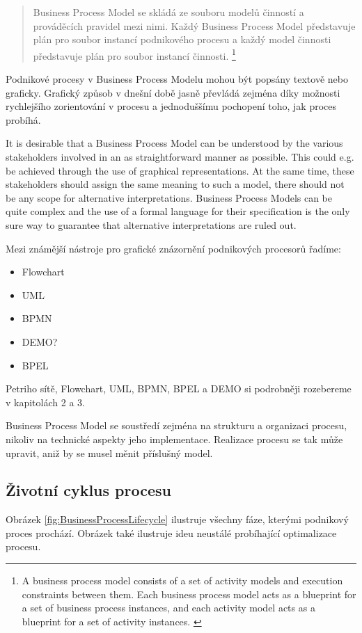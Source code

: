 \documentclass[]{article}
\begin{document}
\begin{quote}
Business Process Model se skládá ze souboru modelů činností a prováděcích pravidel mezi nimi. Každý Business Process Model představuje plán pro soubor instancí podnikového procesu a každý model činnosti představuje plán pro soubor instancí činnosti.
\footnote{A business process model consists of a set of activity models and execution constraints between them. Each business process model acts as a blueprint for a set of business process instances, and each activity model acts as a blueprint for a set of activity instances. \cite{Weske2007}}
\end{quote}

Podnikové procesy v Business Process Modelu mohou být popsány textově nebo graficky. Grafický způsob v dnešní době jasně převládá zejména díky možnosti rychlejšího zorientování v procesu a jednoduššímu pochopení toho, jak proces probíhá.

It is desirable that a Business Process Model can be understood by the various stakeholders involved in an as straightforward manner as possible. This could e.g. be achieved through the use of graphical representations. At the same time, these stakeholders should assign the same meaning to such a model, there should not be any scope for alternative interpretations. Business Process Models can be quite complex and the use of a formal language for their specification is the only sure way to guarantee that alternative interpretations are ruled out. 

Mezi známější nástroje pro grafické znázornění podnikových procesorů řadíme: \cite{Naplava2015}
\begin{itemize}
\item Flowchart
\item UML
\item BPMN
\item DEMO?
\item BPEL
\end{itemize}

Petriho sítě, Flowchart, UML, BPMN, BPEL a DEMO si podrobněji rozebereme v kapitolách 2 a 3. %

Business Process Model se soustředí zejména na strukturu a organizaci procesu, nikoliv na technické aspekty jeho implementace. Realizace procesu se tak může upravit, aniž by se musel měnit příslušný model.

\subsection{Životní cyklus procesu}
Obrázek \ref{fig:BusinessProcessLifecycle} ilustruje všechny fáze, kterými podnikový proces prochází. Obrázek také ilustruje ideu neustálé probíhající optimalizace procesu.
\end{document}
